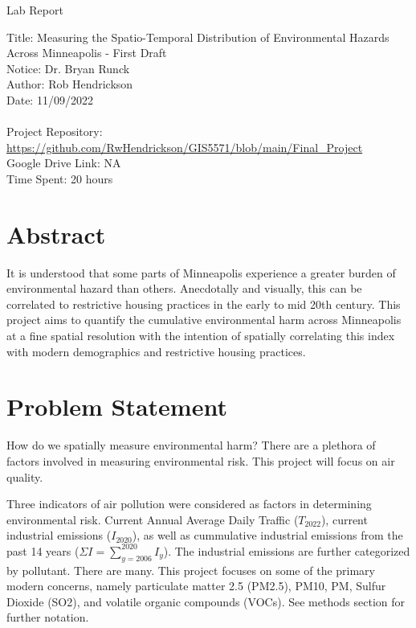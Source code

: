 \documentclass[article,12pt]{article}
\numberwithin{equation}{section}
\begin{document}
\begin{center}
Lab Report

Title: Measuring the Spatio-Temporal Distribution of Environmental Hazards Across Minneapolis - First Draft\\
Notice: Dr. Bryan Runck\\
Author: Rob Hendrickson\\
Date: 11/09/2022\\~\\

Project Repository: \url{https://github.com/RwHendrickson/GIS5571/blob/main/Final_Project}\\
Google Drive Link: NA\\
Time Spent: 20 hours

\end{center}

\section*{Abstract}
It is understood that some parts of Minneapolis experience a greater burden of environmental hazard than others. Anecdotally and visually, this can be correlated to restrictive housing practices in the early to mid 20th century. This project aims to quantify the cumulative environmental harm across Minneapolis at a fine spatial resolution with the intention of spatially correlating this index with modern demographics and restrictive housing practices.


\section*{Problem Statement}

How do we spatially measure environmental harm? There are a plethora of factors involved in measuring environmental risk. This project will focus on air quality.

%

Three indicators of air pollution were considered as factors in determining environmental risk. Current Annual Average Daily Traffic ($T_{2022}$), current industrial emissions ($I_{2020}$), as well as cummulative industrial emissions from the past 14 years ($\Sigma I = \sum_{y=2006}^{2020} I_{y}$). The industrial emissions are further categorized by pollutant. There are many. This project focuses on some of the primary modern concerns, namely particulate matter 2.5 (PM2.5), PM10, PM, Sulfur Dioxide (SO2),  and volatile organic compounds (VOCs). See methods section for further notation.
\end{document}
